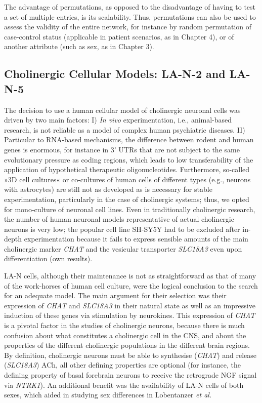 The advantage of permutations, as opposed to the disadvantage of having to test a set of multiple entries, is its scalability. Thus, permutations can also be used to assess the validity of the entire network, for instance by random permutation of case-control status (applicable in patient scenarios, as in Chapter 4), or of another attribute (such as sex, as in Chapter 3).

\subsection{Cholinergic Cellular Models: LA-N-2 and LA-N-5}
The decision to use a human cellular model of cholinergic neuronal cells was driven by two main factors: I) \emph{In vivo} experimentation, i.e., animal-based research, is not reliable as a model of complex human psychiatric diseases.\cite{} II) Particular to RNA-based mechanisms, the difference between rodent and human genes is enormous, for instance in 3' UTRs that are not subject to the same evolutionary pressure as coding regions, which leads to low transferability of the application of hypothetical therapeutic oligonucleotides.\cite{} Furthermore, so-called »3D cell cultures« or co-cultures of human cells of different types (e.g., neurons with astrocytes) are still not as developed as is necessary for stable experimentation, particularly in the case of cholinergic systems;\cite{} thus, we opted for mono-culture of neuronal cell lines. Even in traditionally cholinergic research, the number of human neuronal models representative of actual cholinergic neurons is very low; the popular cell line SH-SY5Y had to be excluded after in-depth experimentation because it fails to express sensible amounts of the main cholinergic marker \emph{CHAT} and the vesicular transporter \emph{SLC18A3} even upon differentiation (own results).

LA-N cells, although their maintenance is not as straightforward as that of many of the work-horses of human cell culture, were the logical conclusion to the search for an adequate model. The main argument for their selection was their expression of \emph{CHAT} and \emph{SLC18A3} in their natural state as well as an impressive induction of these genes via stimulation by neurokines. This expression of \emph{CHAT} is a pivotal factor in the studies of cholinergic neurons, because there is much confusion about what constitutes a cholinergic cell in the CNS, and about the properties of the different cholinergic populations in the different brain regions. By definition, cholinergic neurons must be able to synthesise (\emph{CHAT}) and release (\emph{SLC18A3}) ACh, all other defining properties are optional (for instance, the defining property of basal forebrain neurons to receive the retrograde NGF signal via \emph{NTRK1}). An additional benefit was the availability of LA-N cells of both sexes, which aided in studying sex differences in Lobentanzer \emph{et al.}\cite{Lobentanzer2019a}

